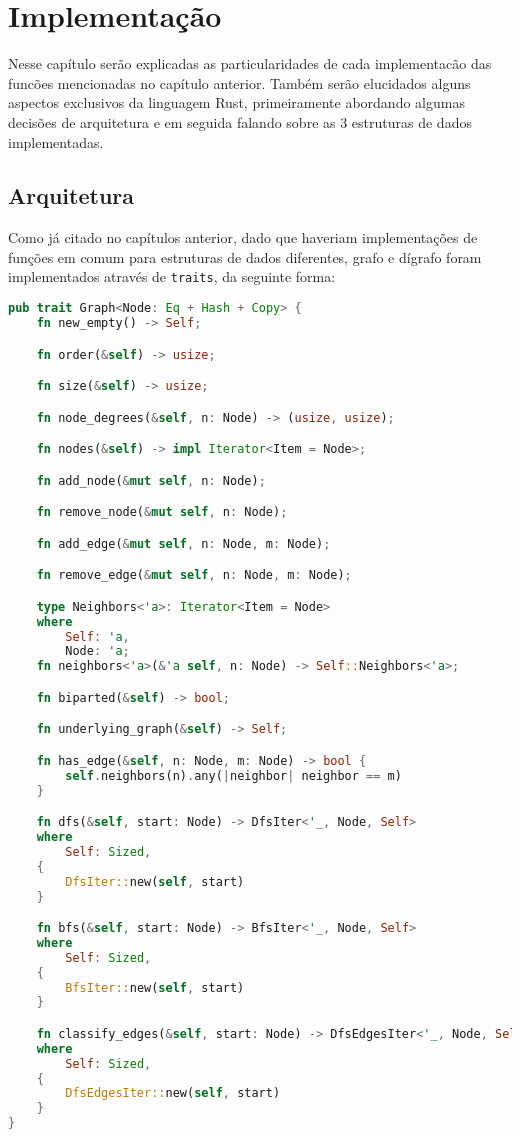 \chapter{Implementação}
\label{ch:implementation}

Nesse capítulo serão explicadas as particularidades de cada implementacão das funcões mencionadas no capítulo anterior. Também serão elucidados alguns aspectos exclusivos da linguagem Rust, primeiramente abordando algumas decisões de arquitetura e em seguida falando sobre as 3 estruturas de dados implementadas.

\section{Arquitetura}

Como já citado no capítulos anterior, dado que haveriam implementações de funções em comum para estruturas de dados diferentes, grafo e dígrafo foram implementados através de \texttt{traits}, da seguinte forma:

\begin{lstlisting}[language=Rust, caption={Implementação do trait Graph}, label=list:trait_graph]
pub trait Graph<Node: Eq + Hash + Copy> {
    fn new_empty() -> Self;

    fn order(&self) -> usize;

    fn size(&self) -> usize;

    fn node_degrees(&self, n: Node) -> (usize, usize);

    fn nodes(&self) -> impl Iterator<Item = Node>;

    fn add_node(&mut self, n: Node);

    fn remove_node(&mut self, n: Node);

    fn add_edge(&mut self, n: Node, m: Node);

    fn remove_edge(&mut self, n: Node, m: Node);

    type Neighbors<'a>: Iterator<Item = Node>
    where
        Self: 'a,
        Node: 'a;
    fn neighbors<'a>(&'a self, n: Node) -> Self::Neighbors<'a>;

    fn biparted(&self) -> bool;

    fn underlying_graph(&self) -> Self;

    fn has_edge(&self, n: Node, m: Node) -> bool {
        self.neighbors(n).any(|neighbor| neighbor == m)
    }

    fn dfs(&self, start: Node) -> DfsIter<'_, Node, Self>
    where
        Self: Sized,
    {
        DfsIter::new(self, start)
    }

    fn bfs(&self, start: Node) -> BfsIter<'_, Node, Self>
    where
        Self: Sized,
    {
        BfsIter::new(self, start)
    }

    fn classify_edges(&self, start: Node) -> DfsEdgesIter<'_, Node, Self>
    where
        Self: Sized,
    {
        DfsEdgesIter::new(self, start)
    }
}
\end{lstlisting}

